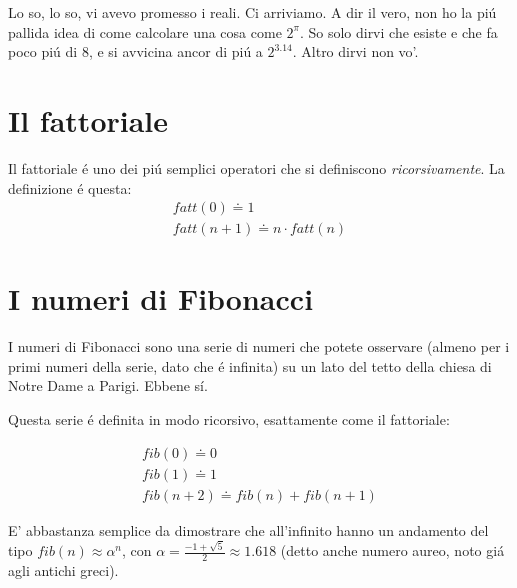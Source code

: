 
Lo so, lo so, vi avevo promesso i reali. Ci arriviamo. A dir il vero, non ho la pi\'u pallida idea di come calcolare una cosa come $2^\pi$. So solo dirvi che esiste e che fa poco pi\'u di $8$, e si avvicina ancor di pi\'u a $2^{3.14}$. Altro dirvi non vo'.



\label{fattoriale} \section{Il fattoriale}

Il fattoriale \'e uno dei pi\'u semplici operatori che si definiscono {\em ricorsivamente}. La definizione \'e questa:
\begin{eqnarray}
fatt(0) \doteq 1\\
fatt(n+1) \doteq n \cdot fatt(n)
\end{eqnarray}


\label{fibonacci} \section{I numeri di Fibonacci}

I numeri di Fibonacci sono una serie di numeri che potete osservare (almeno per i primi numeri della serie, dato che \'e infinita) su un lato del tetto della chiesa di Notre Dame a Parigi. Ebbene s\'i.

Questa serie \'e definita in modo ricorsivo, esattamente come il fattoriale:

\begin{eqnarray}
fib(0)   \doteq 0\\
fib(1)   \doteq 1\\
fib(n+2) \doteq fib(n)+fib(n+1)
\end{eqnarray}

E' abbastanza semplice da dimostrare che all'infinito hanno un andamento del tipo
$fib(n) \approx \alpha^n$, con $\alpha=\frac{-1+\sqrt{5}}{2} \approx 1.618$
(detto anche numero aureo, noto gi\'a agli antichi greci).


